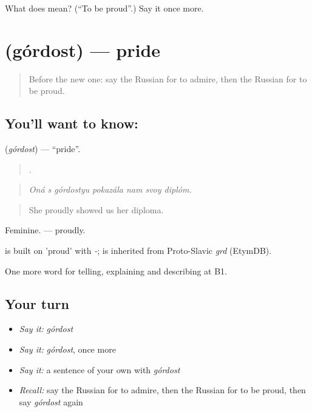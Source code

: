 \begin{tcolorbox}[breakable,colback=teal!4,colframe=teal!35!black,title={Before you move on}]
What does  mean? (\textquotedblleft{}To be proud\textquotedblright{}.) Say it once more.
\end{tcolorbox}
\section[\texorpdfstring{\ru{гордость} (górdost)}{гордость (górdost)}]{ (górdost) — pride}

\label{lesson:RU-C475-gordost}



\begin{quote}
Before the new one: say the Russian for to admire, then the Russian for to be proud.
\end{quote}

\subsection*{You'll want to know: }
\textbf{} (\emph{górdost}) — \textquotedblleft{}pride\textquotedblright{}.

\begin{quote}
      .
\end{quote}

\begin{quote}
\emph{Oná s górdostyu pokazála nam svoy diplóm.}
\end{quote}

\begin{quote}
She proudly showed us her diploma.
\end{quote}

Feminine. \emph{ } — proudly.

\begin{cousinweb}
\emph{} is built on \emph{} 'proud' with \emph{-}; \emph{} is inherited from Proto-Slavic \emph{grd} (EtymDB).
\end{cousinweb}

\begin{grammarlens}[title={What you've built}]
One more word for telling, explaining and describing at B1.
\end{grammarlens}

\subsection*{Your turn}
\begin{itemize}
\raggedright
  \item \emph{Say it:} \emph{górdost}
  \item \emph{Say it:} \emph{górdost}, once more
  \item \emph{Say it:} a sentence of your own with \emph{górdost}
  \item \emph{Recall:} say the Russian for to admire, then the Russian for to be proud, then say \emph{górdost} again
\end{itemize}

